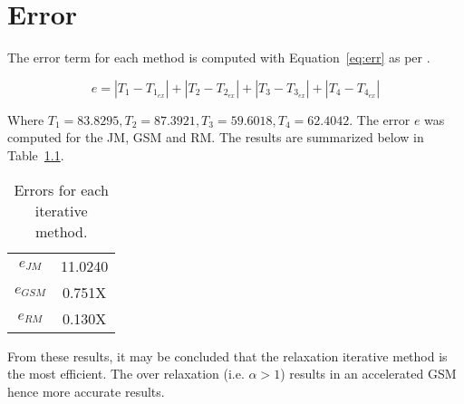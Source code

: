 \chapter{Error}
\label{chap:error}

The error term for each method is computed with Equation~\ref{eq:err} as per \cite{assign}.

\begin{equation}
	\label{eq:err}	
	e = |T_1 - T_{1_{ex}}|+|T_2 - T_{2_{ex}}|+|T_3 - T_{3_{ex}}|+|T_4 - T_{4_{ex}}|
\end{equation}

Where $T_1 = 83.8295, T_2 = 87.3921, T_3 = 59.6018, T_4 = 62.4042$. The error $e$ was computed for the JM, GSM and RM. The results are summarized below in Table~\ref{tab:err}.

\begin{table}[H]
  \centering
  \caption{Errors for each iterative method.}
    \begin{tabular}{c|c}
    $e_{JM}$ 	& 11.0240 \\
    $e_{GSM}$ 	& 0.751X \\
    $e_{RM}$ 	& 0.130X \\
    \end{tabular}
  \label{tab:err}
\end{table}

From these results, it may be concluded that the relaxation iterative method is the most efficient. The over relaxation  (i.e. $\alpha>1$) results in an accelerated GSM hence more accurate results. 


